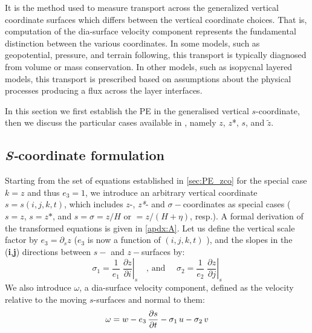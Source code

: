\documentclass[../main/NEMO_manual]{subfiles}
\begin{document}
It is the method used to measure transport across the generalized vertical coordinate surfaces which differs between
the vertical coordinate choices.
That is, computation of the dia-surface velocity component represents the fundamental distinction between
the various coordinates.
In some models, such as geopotential, pressure, and terrain following, this transport is typically diagnosed from
volume or mass conservation.
In other models, such as isopycnal layered models, this transport is prescribed based on assumptions about
the physical processes producing a flux across the layer interfaces. 


In this section we first establish the PE in the generalised vertical $s$-coordinate,
then we discuss the particular cases available in \NEMO, namely $z$, $z$*, $s$, and $\tilde z$.  

\subsection{\textit{S-}coordinate formulation}

Starting from the set of equations established in \autoref{sec:PE_zco} for the special case $k=z$ and thus $e_3=1$,
we introduce an arbitrary vertical coordinate $s=s(i,j,k,t)$,
which includes $z$-, \textit{z*}- and $\sigma-$coordinates as special cases
($s=z$, $s=\textit{z*}$, and $s=\sigma=z/H$ or $=z/\left(H+\eta \right)$, resp.).
A formal derivation of the transformed equations is given in \autoref{apdx:A}.
Let us define the vertical scale factor by $e_3=\partial_s z$  ($e_3$ is now a function of $(i,j,k,t)$ ),
and the slopes in the (\textbf{i},\textbf{j}) directions between $s-$ and $z-$surfaces by:
\begin{equation}
  \label{eq:PE_sco_slope}
  \sigma_1 =\frac{1}{e_1 }\;\left. {\frac{\partial z}{\partial i}} \right|_s
  \quad \text{, and } \quad
  \sigma_2 =\frac{1}{e_2 }\;\left. {\frac{\partial z}{\partial j}} \right|_s
\end{equation}
We also introduce  $\omega $, a dia-surface velocity component, defined as the velocity 
relative to the moving $s$-surfaces and normal to them:
\[
  \omega  = w - e_3 \, \frac{\partial s}{\partial t} - \sigma_1 \,u - \sigma_2 \,v    \\
\]
\end{document}
